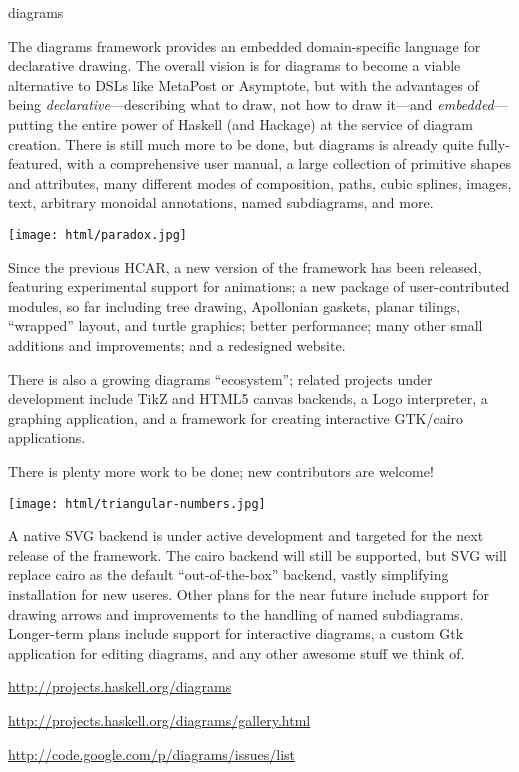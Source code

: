 \begin{hcarentry}[updated]{diagrams}
\makeheader

The diagrams framework provides an embedded domain-specific language
for declarative drawing.  The overall vision is for diagrams to become
a viable alternative to DSLs like MetaPost or Asymptote, but with the
advantages of being \emph{declarative}---describing what to draw, not
how to draw it---and \emph{embedded}---putting the entire power of
Haskell (and Hackage) at the service of diagram creation.  There is
still much more to be done, but diagrams is already quite
fully-featured, with a comprehensive user manual, a large collection of
primitive shapes and attributes, many different modes of composition,
paths, cubic splines, images, text, arbitrary monoidal annotations,
named subdiagrams, and more.

\begin{center}
\texttt{[image: html/paradox.jpg]}
\end{center}

Since the previous HCAR, a new version of the framework has been
released, featuring experimental support for animations; a new package
of user-contributed modules, so far including tree drawing, Apollonian
gaskets, planar tilings, ``wrapped'' layout, and turtle graphics;
better performance; many other small additions and
improvements; and a redesigned website.

There is also a growing diagrams ``ecosystem''; related projects under
development include TikZ and HTML5 canvas backends, a Logo
interpreter, a graphing application, and a framework for creating
interactive GTK/cairo applications.

There is plenty more work to be done; new contributors are welcome!

\begin{center}
\texttt{[image: html/triangular-numbers.jpg]}
\end{center}

\FuturePlans

A native SVG backend is under active development and targeted for the
next release of the framework.  The cairo backend will still be
supported, but SVG will replace cairo as the default
``out-of-the-box'' backend, vastly simplifying installation for new
useres. Other plans for the near future include support for drawing
arrows and improvements to the handling of named subdiagrams.
Longer-term plans include support for interactive diagrams, a custom
Gtk application for editing diagrams, and any other awesome stuff we
think of.

\FurtherReading
\begin{compactitem}
\item \url{http://projects.haskell.org/diagrams}
\item \url{http://projects.haskell.org/diagrams/gallery.html}
\item \url{http://code.google.com/p/diagrams/issues/list}
\end{compactitem}
\end{hcarentry}
